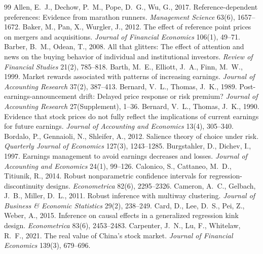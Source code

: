 \documentclass[11pt]{article}
\begin{document}
\small
\begin{thebibliography}{99}
 Allen, E.~J., Dechow, P.~M., Pope, D.~G., Wu, G., 2017. Reference-dependent
preferences: Evidence from marathon runners. \emph{Management Science} 63(6), 1657--1672.
 Baker, M., Pan, X., Wurgler, J., 2012. The effect of reference point prices on
mergers and acquisitions. \emph{Journal of Financial Economics} 106(1), 49--71.
 Barber, B.~M., Odean, T., 2008. All that glitters: The effect of attention
and news on the buying behavior of individual and institutional investors. \emph{Review of Financial Studies} 21(2),
785--818.
 Barth, M.~E., Elliott, J.~A., Finn, M.~W., 1999. Market rewards associated with
patterns of increasing earnings. \emph{Journal of Accounting Research} 37(2), 387--413.
 Bernard, V.~L., Thomas, J.~K., 1989. Post-earnings-announcement drift:
Delayed price response or risk premium? \emph{Journal of Accounting Research} 27(Supplement), 1--36.
 Bernard, V.~L., Thomas, J.~K., 1990. Evidence that stock prices do not
fully reflect the implications of current earnings for future earnings. \emph{Journal of Accounting and Economics}
13(4), 305--340.
 Bordalo, P., Gennaioli, N., Shleifer, A., 2012. Salience theory of choice
under risk. \emph{Quarterly Journal of Economics} 127(3), 1243--1285.
 Burgstahler, D., Dichev, I., 1997. Earnings management to avoid
earnings decreases and losses. \emph{Journal of Accounting and Economics} 24(1), 99--126.
 Calonico, S., Cattaneo, M.~D., Titiunik, R., 2014. Robust nonparametric
confidence intervals for regression-discontinuity designs. \emph{Econometrica} 82(6), 2295--2326.
 Cameron, A.~C., Gelbach, J.~B., Miller, D.~L., 2011. Robust inference with
multiway clustering. \emph{Journal of Business \& Economic Statistics} 29(2), 238--249.
 Card, D., Lee, D.~S., Pei, Z., Weber, A., 2015. Inference on causal effects in a
generalized regression kink design. \emph{Econometrica} 83(6), 2453--2483.
 Carpenter, J.~N., Lu, F., Whitelaw, R.~F., 2021. The real value of
China's stock market. \emph{Journal of Financial Economics} 139(3), 679--696.

\end{thebibliography}
\end{document}
